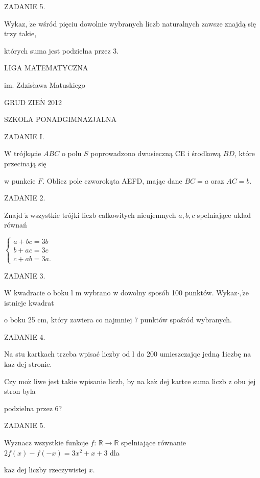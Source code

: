 \documentclass[a4paper,12pt]{article}
\begin{document}
ZADANIE 5.

Wykaz, $\dot{\mathrm{z}}\mathrm{e}$ wśród pięciu dowolnie wybranych liczb naturalnych zawsze znajdą się trzy takie,

których suma jest podzielna przez 3.






LIGA MATEMATYCZNA

im. Zdzisława Matuskiego

GRUD Z$\mathrm{I}\mathrm{E}\acute{\mathrm{N}}$ 2012

SZKOLA PONADGIMNAZJALNA

ZADANIE I.

$\mathrm{W}$ trójkącie $ABC$ o polu $S$ poprowadzono dwusieczną CE i środkową $BD$, które przecinają się

w punkcie $F$. Oblicz pole czworokąta AEFD, mając dane $BC=a$ oraz $AC=b.$

ZADANIE 2.

Znajd $\acute{\mathrm{z}}$ wszystkie trójki liczb calkowitych nieujemnych $a, b, c$ spelniające uklad równań

$\left\{\begin{array}{l}
a+bc=3b\\
b+ac=3c\\
c+ab=3a.
\end{array}\right.$

ZADANIE 3.

$\mathrm{W}$ kwadracie o boku l $\mathrm{m}$ wybrano w dowolny sposób 100 punktów. Wykaz$\cdot, \dot{\mathrm{z}}\mathrm{e}$ istnieje kwadrat

o boku 25 cm, który zawiera co najmniej 7 punktów spośród wybranych.

ZADANIE 4.

Na stu kartkach trzeba wpisać liczby od l do 200 umieszczajqc jedną 1iczbę na $\mathrm{k}\mathrm{a}\dot{\mathrm{z}}$ dej stronie.

Czy $\mathrm{m}\mathrm{o}\dot{\mathrm{z}}$ liwe jest takie wpisanie liczb, by na $\mathrm{k}\mathrm{a}\dot{\mathrm{z}}$ dej kartce suma liczb z obu jej stron byla

podzielna przez 6?

ZADANIE 5.

Wyznacz wszystkie funkcje $f$: $\mathbb{R}\rightarrow \mathbb{R}$ spełniające równanie $2f(x)-f(-x)=3x^{2}+x+3$ dla

$\mathrm{k}\mathrm{a}\dot{\mathrm{z}}$ dej liczby rzeczywistej $x.$
\end{document}

